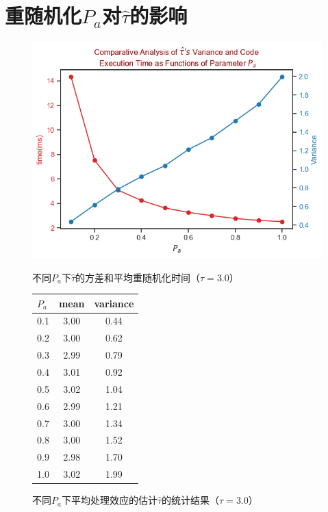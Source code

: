 \section{重随机化$P_a$对$\hat{\tau}$的影响}

\begin{figure}[ht]
    \centering
    \begin{minipage}{0.7\textwidth}
        \centering
        \includegraphics[width=\textwidth]{figures/重随机化Pa的影响.png} %
        \caption{不同$P_a$下$\hat{\tau}$的方差和平均重随机化时间（$\tau=3.0$）}
       \label{fig:Comparative stats Analysis of Average Treatment Effects by Pa}
    \end{minipage}\hfill
    \begin{minipage}{0.3\textwidth}
        \centering
        \begin{tabular}{lcc}
            \hline
        $P_a$ & mean & variance \\
        \hline
            0.1 & 3.00 & 0.44 \\
            0.2 & 3.00 & 0.62 \\
            0.3 & 2.99 & 0.79 \\
            0.4 & 3.01 & 0.92 \\
            0.5 & 3.02 & 1.04 \\
            0.6 & 2.99 & 1.21 \\
            0.7 & 3.00 & 1.34 \\
            0.8 & 3.00 & 1.52 \\
            0.9 & 2.98 & 1.70 \\
            1.0 & 3.02 & 1.99 \\
            \hline
        \end{tabular}
        \caption{不同$P_a$下平均处理效应的估计$\hat{\tau}$的统计结果（$\tau=3.0$）}
        \label{tab:Comparative stats Analysis of Average Treatment Effects by Pa}
    \end{minipage}
\end{figure}


